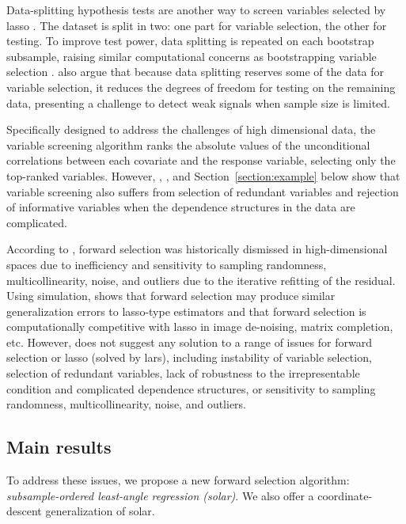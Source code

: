 \documentclass[11pt,review,authoryear]{elsarticle}
\begin{document}
Data-splitting hypothesis tests are another way to screen variables selected by lasso \citep{wasserman2009high, meinshausen2009p,romano2019multiple, diciccio2020exact}. The dataset is split in two: one part for variable selection, the other for testing. To improve test power, data splitting is repeated on each bootstrap subsample, raising similar computational concerns as bootstrapping variable selection \citep{bach2008bolasso}. \citet{diciccio2020exact} also argue that because data splitting reserves some of the data for variable selection, it reduces the degrees of freedom for testing on the remaining data, presenting a challenge to detect weak signals when sample size is limited.

Specifically designed to address the challenges of high dimensional data, the variable screening algorithm \citep{fan2008sure, hall2009using,hall2009usingb, li2012robust, li2012feature} ranks the absolute values of the unconditional correlations between each covariate and the response variable, selecting only the top-ranked variables. However, \citet{fan2008sure}, \citet{barut2016conditional}, and Section~\ref{section:example} below show that variable screening also suffers from selection of redundant variables and rejection of informative variables when the dependence structures in the data are complicated.

According to \citet{friedman2001elements, weisberg04}, forward selection was historically dismissed in high-dimensional spaces due to inefficiency and sensitivity to sampling randomness, multicollinearity, noise, and outliers due to the iterative refitting of the residual. Using simulation, \citet{tibshirani2015general} shows that forward selection may produce similar generalization errors to lasso-type estimators and that forward selection is computationally competitive with lasso in image de-noising, matrix completion, etc. However, \citet{tibshirani2015general} does not suggest any solution to a range of issues for forward selection or lasso (solved by lars), including instability of variable selection, selection of redundant variables, lack of robustness to the irrepresentable condition and complicated dependence structures, or sensitivity to sampling randomness, multicollinearity, noise, and outliers.

\subsection{Main results}

To address these issues, we propose a new forward selection algorithm: \emph{subsample-ordered least-angle regression (solar)}. We also offer a coordinate-descent generalization of solar.
\end{document}
